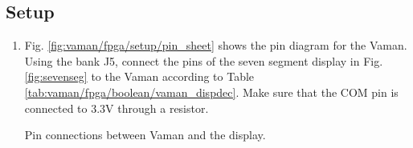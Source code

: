 \documentclass[journal,12pt,twocolumn]{IEEEtran}
\renewcommand\thesection{\arabic{section}}
\renewcommand\thesubsection{\thesection.\arabic{subsection}}
\begin{document}
\subsection{Setup}
\renewcommand{\theequation}{\theenumi}
\renewcommand{\thefigure}{\theenumi}
\begin{enumerate}[label=\thesubsection.\arabic*.,ref=\thesubsection.\theenumi]


\item Fig. \ref{fig:vaman/fpga/setup/pin_sheet} shows the pin diagram for the Vaman.  Using the bank J5, connect the pins of  the seven segment display in Fig. \ref{fig:sevenseg} to the Vaman according to Table  \ref{tab:vaman/fpga/boolean/vaman_dispdec}.  Make sure that the COM pin is connected to 3.3V through a resistor.
\begin{table}[!ht]
\centering
\parbox{.45\columnwidth}{

}
\hfill
\parbox{.45\columnwidth}{

}
\caption{Pin connections between Vaman and the display.}
\label{tab:vaman/fpga/boolean/vaman_dispdec}
\end{table}

%

\end{enumerate}
\end{document}
